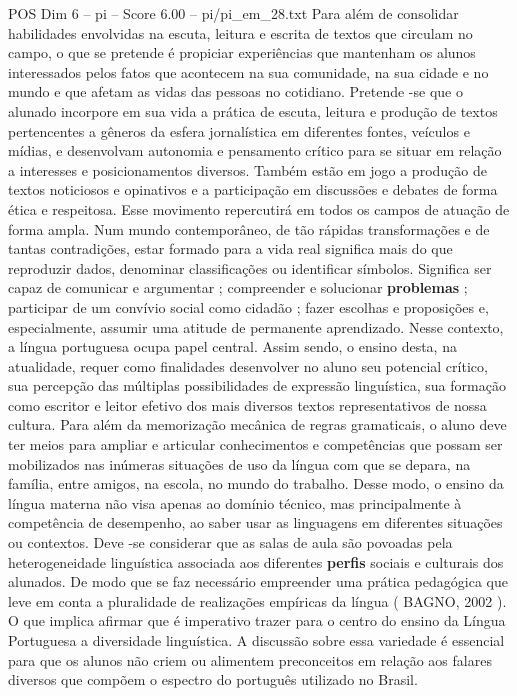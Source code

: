 \begin{textsample}{POS Dim 6 – pi – Score 6.00 – pi/pi\_em\_28.txt}
Para além de consolidar habilidades envolvidas na escuta, leitura e escrita de textos que circulam no campo, o que se pretende é propiciar experiências que mantenham os alunos interessados pelos fatos que acontecem na sua comunidade, na sua cidade e no mundo e que afetam as vidas das pessoas no cotidiano.
Pretende -se que o alunado incorpore em sua vida a prática de escuta, leitura e produção de textos pertencentes a gêneros da esfera jornalística em diferentes fontes, veículos e mídias, e desenvolvam autonomia e pensamento crítico para se situar em relação a interesses e posicionamentos diversos.
Também estão em jogo a produção de textos noticiosos e opinativos e a participação em discussões e debates de forma ética e respeitosa.
Esse movimento repercutirá em todos os campos de atuação de forma ampla.
Num mundo contemporâneo, de tão rápidas transformações e de tantas contradições, estar formado para a vida real significa mais do que reproduzir dados, denominar classificações ou identificar símbolos.
Significa ser capaz de comunicar e argumentar ; compreender e solucionar \textbf{problemas} ; participar de um convívio social como cidadão ; fazer escolhas e proposições e, especialmente, assumir uma atitude de permanente aprendizado.
Nesse contexto, a língua portuguesa ocupa papel central.
Assim sendo, o ensino desta, na atualidade, requer como finalidades desenvolver no aluno seu potencial crítico, sua percepção das múltiplas possibilidades de expressão linguística, sua formação como escritor e leitor efetivo dos mais diversos textos representativos de nossa cultura.
Para além da memorização mecânica de regras gramaticais, o aluno deve ter meios para ampliar e articular conhecimentos e competências que possam ser mobilizados nas inúmeras situações de uso da língua com que se depara, na família, entre amigos, na escola, no mundo do trabalho.
Desse modo, o ensino da língua materna não visa apenas ao domínio técnico, mas principalmente à competência de desempenho, ao saber usar as linguagens em diferentes situações ou contextos.
Deve -se considerar que as salas de aula são povoadas pela heterogeneidade linguística associada aos diferentes \textbf{perfis} sociais e culturais dos alunados.
De modo que se faz necessário empreender uma prática pedagógica que leve em conta a pluralidade de realizações empíricas da língua ( BAGNO, 2002 ).
O que implica afirmar que é imperativo trazer para o centro do ensino da Língua Portuguesa a diversidade linguística.
A discussão sobre essa variedade é essencial para que os alunos não criem ou alimentem preconceitos em relação aos falares diversos que compõem o espectro do português utilizado no Brasil.

\end{textsample}
